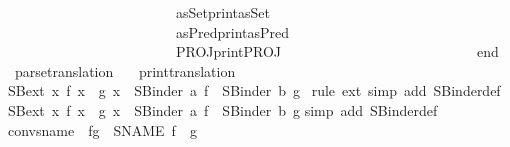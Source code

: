 \begin{isabellebody}
\ \ \ \ \ \ \ \ \ \ \ \ \ \ \ \ \ \ \ \ \ \ \ \ \ {\isacharparenleft}{\isachardoublequote}asSet{\isachardoublequote}{\isacharcomma}print{\isacharunderscore}asSet{\isacharparenright}{\isacharcomma}\isanewline
\ \ \ \ \ \ \ \ \ \ \ \ \ \ \ \ \ \ \ \ \ \ \ \ \ {\isacharparenleft}{\isachardoublequote}asPred{\isachardoublequote}{\isacharcomma}print{\isacharunderscore}asPred{\isacharparenright}{\isacharcomma}\isanewline
\ \ \ \ \ \ \ \ \ \ \ \ \ \ \ \ \ \ \ \ \ \ \ \ \ {\isacharparenleft}{\isachardoublequote}PROJ{\isachardoublequote}{\isacharcomma}print{\isacharunderscore}PROJ{\isacharparenright}\ \isanewline
\ \ \ \ \ \ \ \ \ \ \ \ \ \ \ \ \ \ \ \ \ \ \ \ {\isacharbrackright}{\isacharsemicolon}\isanewline
\ \isanewline
end\isanewline
{\isacharverbatimclose}\isanewline
\isanewline
{}\isamarkupfalse%
\ {\isacharverbatimopen}\ parse{\isacharunderscore}translation\ {\isacharverbatimclose}\isanewline
{}\isamarkupfalse%
\ {\isacharverbatimopen}\ print{\isacharunderscore}translation\ {\isacharverbatimclose}%
\endisatagML
{\isafoldML}%
%
\isadelimML
%
\endisadelimML
%
\isamarkuptrue%
%
\isamarkuptrue%
\isamarkupfalse%
\ SB{}{\isacharunderscore}ext{\isacharcolon}\ {\isachardoublequoteopen}{\isacharparenleft}{\isasymAnd}x{\isachardot}\ f\ x\ {\isacharequal}\ g\ x{\isacharparenright}\ {\isasymLongrightarrow}\ SBinder{}\ a\ f\ {\isacharequal}\ SBinder{}\ b\ g{\isachardoublequoteclose}\isanewline
%
\isadelimproof
%
\endisadelimproof
%
\isatagproof
{}\isamarkupfalse%
\ {\isacharparenleft}rule\ ext{\isacharcomma}\ simp\ add{\isacharcolon}\ SBinder{}{\isacharunderscore}def{\isacharparenright}%
\endisatagproof
{\isafoldproof}%
%
\isadelimproof
\isanewline
%
\endisadelimproof
\isanewline
{}\isamarkupfalse%
\ SB{\isacharunderscore}ext{\isacharcolon}\ {\isachardoublequoteopen}{\isacharparenleft}{\isasymAnd}x{\isachardot}\ f\ x\ {\isacharequal}\ g\ x{\isacharparenright}\ {\isasymLongrightarrow}\ SBinder\ a\ f\ {\isacharequal}\ SBinder\ b\ g{\isachardoublequoteclose}\isanewline
%
\isadelimproof
%
\endisadelimproof
%
\isatagproof
{}\isamarkupfalse%
{\isacharparenleft}simp\ add{\isacharcolon}\ SBinder{\isacharunderscore}def{\isacharparenright}%
\endisatagproof
{\isafoldproof}%
%
\isadelimproof
\isanewline
%
\endisadelimproof
\isanewline
\isanewline
{}\isamarkupfalse%
\ conv{\isacharunderscore}sname{}\ {\isacharcolon}\ {\isachardoublequoteopen}f{\isasymequiv}g\ {\isasymLongrightarrow}\ SNAME{}\ f\ {\isacharequal}\ g{\isachardoublequoteclose}\isanewline

\end{isabellebody}
